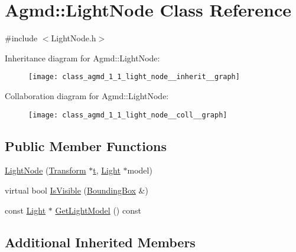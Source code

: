 \hypertarget{class_agmd_1_1_light_node}{\section{Agmd\+:\+:Light\+Node Class Reference}
\label{class_agmd_1_1_light_node}
}


{\ttfamily \#include $<$Light\+Node.\+h$>$}



Inheritance diagram for Agmd\+:\+:Light\+Node\+:\nopagebreak
\begin{figure}[H]
\begin{center}
\leavevmode
\texttt{[image: class\_agmd\_1\_1\_light\_node\_\_inherit\_\_graph]}
\end{center}
\end{figure}


Collaboration diagram for Agmd\+:\+:Light\+Node\+:\nopagebreak
\begin{figure}[H]
\begin{center}
\leavevmode
\texttt{[image: class\_agmd\_1\_1\_light\_node\_\_coll\_\_graph]}
\end{center}
\end{figure}
\subsection*{Public Member Functions}
\begin{DoxyCompactItemize}
\item 
\hyperlink{class_agmd_1_1_light_node_adafb3d751e1c9bcb8f5bf0da2d69e680}{Light\+Node} (\hyperlink{class_agmd_maths_1_1_transform}{Transform} $\ast$\hyperlink{_examples_2_planet_2_app_8cpp_a125ce9f8ead659256dbdd0816ede24d4}{t}, \hyperlink{class_agmd_1_1_light}{Light} $\ast$model)
\item 
virtual bool \hyperlink{class_agmd_1_1_light_node_aa29cbd336d142243400b8f6ac4043343}{Is\+Visible} (\hyperlink{class_agmd_1_1_bounding_box}{Bounding\+Box} \&)
\item 
const \hyperlink{class_agmd_1_1_light}{Light} $\ast$ \hyperlink{class_agmd_1_1_light_node_a7df364b3ef6d9768f0b727a8c34309d5}{Get\+Light\+Model} () const 
\end{DoxyCompactItemize}
\subsection*{Additional Inherited Members}


